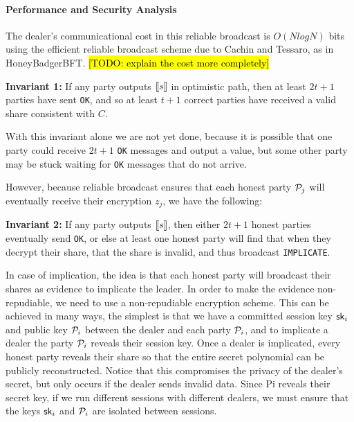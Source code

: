 \documentclass{sig-alternate-05-2015}
\newcommand{\todo}[1]{{\hl{[TODO: #1]}}}
\begin{document}
\paragraph{Performance and Security Analysis}

The dealer's communicational cost in this reliable broadcast is $O( N log N )$ bits using the efficient reliable broadcast scheme due to Cachin and Tessaro, as in HoneyBadgerBFT.
\todo{explain the cost more completely}

\textbf{Invariant 1:} If any party outputs $\share{s}$ in optimistic path, then at least $2t+1$ parties have sent \texttt{OK}, and so at least $t+1$ correct parties have received a valid share consistent with $C$.

  With this invariant alone we are not yet done, because it is possible that one party could receive $2t+1$ \texttt{OK} messages and output a value, but some other party may be stuck waiting for \texttt{OK} messages that do not arrive.

  However, because reliable broadcast ensures that each honest party $\P_j$ will eventually receive their encryption $z_j$, we have the following:

\textbf{Invariant 2:} If any party outputs $\share{s}$, then either $2t+1$ honest parties eventually send \texttt{OK}, or else at least one honest party will find that when they decrypt their share, that the share is invalid, and thus broadcast \texttt{IMPLICATE}.

  In case of implication, the idea is that each honest party will broadcast their shares as evidence to implicate the leader. In order to make the evidence non-repudiable, we need to use a non-repudiable encryption scheme. This can be achieved in many ways, the simplest is that we have a committed session key $\sk_i$ and public key $\P_i$ between the dealer and each party $\P_i$, and to implicate a dealer the party $\P_i$ reveals their session key. Once a dealer is implicated, every honest party reveals their share so that the entire secret polynomial can be publicly reconstructed. Notice that this compromises the privacy of the dealer’s secret, but only occurs if the dealer sends invalid data. Since Pi reveals their secret key, if we run different sessions with different dealers, we must ensure that the keys $\sk_i$ and $\P_i$ are isolated between sessions.
\end{document}
